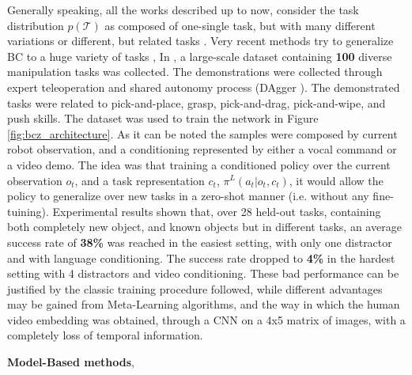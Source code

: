 Generally speaking, all the works described up to now, consider the task distribution $p(\mathcal{T})$ as composed of one-single task, but with many different variations \cite{finn2017one_shot_visual_il} or different, but related tasks \cite{yu2018daml}. Very recent methods try to generalize BC to a huge variety of tasks \cite{jang2022bc_z,mandi2022towards_more_generalizable_one_shot}, 
In \cite{jang2022bc_z}, a large-scale dataset containing \textbf{100} diverse manipulation tasks was collected. The demonstrations were collected through expert teleoperation and shared autonomy process (DAgger \cite{ross2011dagger}). The demonstrated tasks were related to pick-and-place, grasp, pick-and-drag, pick-and-wipe, and push skills. The dataset was used to train the network in Figure \ref{fig:bcz_architecture}. As it can be noted the samples were composed by current robot observation, and a conditioning represented by either a vocal command or a video demo. The idea was that training a conditioned policy over the current observation $o_{t}$, and a task representation $c_{t}$, $\pi^{L}(a_{t}|o_{t}, c_{t})$, it would allow the policy to generalize over new tasks in a zero-shot manner (i.e. without any fine-tuining). Experimental results shown that, over 28 held-out tasks, containing both completely new object, and known objects but in different tasks, an average success rate of \textbf{38\%} was reached in the easiest setting, with only one distractor and with language conditioning. The success rate dropped to \textbf{4\%} in the hardest setting with 4 distractors and video conditioning. These bad performance can be justified by the classic training procedure followed, while different advantages may be gained from Meta-Learning algorithms, and the way in which the human video embedding was obtained, through a CNN on a 4x5 matrix
of images, with a completely loss of temporal information.


\textbf{Model-Based methods},

